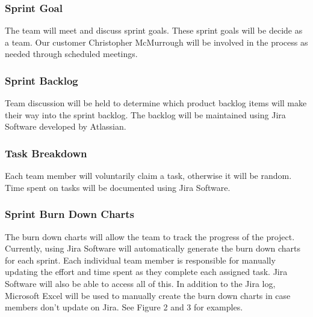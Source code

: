 
\subsubsection{Sprint Goal}
The team will meet and discuss sprint goals. These sprint goals will be decide as a team. Our customer Christopher McMurrough will be involved in the process as needed through scheduled meetings.


\subsubsection{Sprint Backlog}
Team discussion will be held to determine which product backlog items will make their way into the sprint backlog. The backlog will be maintained using Jira Software developed by Atlassian.


\subsubsection{Task Breakdown}
Each team member will voluntarily claim a task, otherwise it will be random. Time spent on tasks will be documented using Jira Software.


\subsubsection{Sprint Burn Down Charts}
The burn down charts will allow the team to track the progress of the project. Currently, using Jira Software will automatically generate the burn down charts for each sprint. Each individual team member is responsible for manually updating the effort and time spent as they complete each assigned task. Jira Software will also be able to access all of this. In addition to the Jira log, Microsoft Excel will be used to manually create the burn down charts in case members don't update on Jira. See Figure 2 and 3 for examples.

